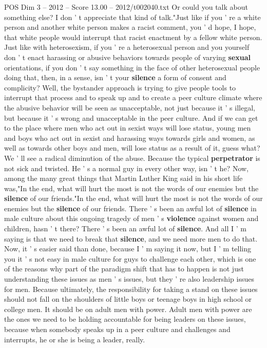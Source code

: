 \begin{textsample}{POS Dim 3 – 2012 – Score 13.00 – 2012/t002040.txt}
Or could you talk about something else?
I don ' t appreciate that kind of talk."Just like if you ' re a white person and another white person makes a racist comment, you ' d hope, I hope, that white people would interrupt that racist enactment by a fellow white person.
Just like with heterosexism, if you ' re a heterosexual person and you yourself don ' t enact harassing or abusive behaviors towards people of varying \textbf{sexual} orientations, if you don ' t say something in the face of other heterosexual people doing that, then, in a sense, isn ' t your \textbf{silence} a form of consent and complicity?
Well, the bystander approach is trying to give people tools to interrupt that process and to speak up and to create a peer culture climate where the abusive behavior will be seen as unacceptable, not just because it ' s illegal, but because it ' s wrong and unacceptable in the peer culture.
And if we can get to the place where men who act out in sexist ways will lose status, young men and boys who act out in sexist and harassing ways towards girls and women, as well as towards other boys and men, will lose status as a result of it, guess what?
We ' ll see a radical diminution of the abuse.
Because the typical \textbf{perpetrator} is not sick and twisted.
He ' s a normal guy in every other way, isn ' t he?
Now, among the many great things that Martin Luther King said in his short life was,"In the end, what will hurt the most is not the words of our enemies but the \textbf{silence} of our friends."In the end, what will hurt the most is not the words of our enemies but the \textbf{silence} of our friends.
There ' s been an awful lot of \textbf{silence} in male culture about this ongoing tragedy of men ' s \textbf{violence} against women and children, hasn ' t there?
There ' s been an awful lot of \textbf{silence}.
And all I ' m saying is that we need to break that \textbf{silence}, and we need more men to do that.
Now, it ' s easier said than done, because I ' m saying it now, but I ' m telling you it ' s not easy in male culture for guys to challenge each other, which is one of the reasons why part of the paradigm shift that has to happen is not just understanding these issues as men ' s issues, but they ' re also leadership issues for men.
Because ultimately, the responsibility for taking a stand on these issues should not fall on the shoulders of little boys or teenage boys in high school or college men.
It should be on adult men with power.
Adult men with power are the ones we need to be holding accountable for being leaders on these issues, because when somebody speaks up in a peer culture and challenges and interrupts, he or she is being a leader, really.

\end{textsample}
